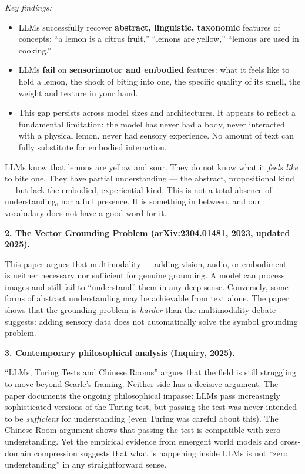 \documentclass[11pt, a4paper]{article}
\begin{document}
\emph{Key findings:}
\begin{itemize}[leftmargin=2em]
  \item LLMs successfully recover \textbf{abstract, linguistic,
    taxonomic} features of concepts: ``a lemon is a citrus fruit,''
    ``lemons are yellow,'' ``lemons are used in cooking.''
  \item LLMs \textbf{fail} on \textbf{sensorimotor and embodied}
    features: what it feels like to hold a lemon, the shock of biting
    into one, the specific quality of its smell, the weight and texture
    in your hand.
  \item This gap persists across model sizes and architectures. It
    appears to reflect a fundamental limitation: the model has never had
    a body, never interacted with a physical lemon, never had sensory
    experience. No amount of text can fully substitute for embodied
    interaction.
\end{itemize}

\begin{keyinsight}
LLMs know that lemons are yellow and sour. They do not know what it
\emph{feels like} to bite one. They have partial understanding ---
the abstract, propositional kind --- but lack the embodied,
experiential kind. This is not a total absence of understanding, nor
a full presence. It is something in between, and our vocabulary does
not have a good word for it.
\end{keyinsight}

\textbf{2. The Vector Grounding Problem (arXiv:2304.01481, 2023, updated
2025).}

This paper argues that multimodality --- adding vision, audio, or
embodiment --- is neither necessary nor sufficient for genuine
grounding. A model can process images and still fail to ``understand''
them in any deep sense. Conversely, some forms of abstract understanding
may be achievable from text alone. The paper shows that the grounding
problem is \emph{harder} than the multimodality debate suggests: adding
sensory data does not automatically solve the symbol grounding problem.

\textbf{3. Contemporary philosophical analysis (Inquiry, 2025).}

``LLMs, Turing Tests and Chinese Rooms'' argues that the field is still
struggling to move beyond Searle's framing. Neither side has a decisive
argument. The paper documents the ongoing philosophical impasse: LLMs
pass increasingly sophisticated versions of the Turing test, but passing
the test was never intended to be \emph{sufficient} for understanding
(even Turing was careful about this). The Chinese Room argument shows that
passing the test is compatible with zero understanding. Yet the empirical
evidence from emergent world models and cross-domain compression suggests
that what is happening inside LLMs is not ``zero understanding'' in any
straightforward sense.
\end{document}
